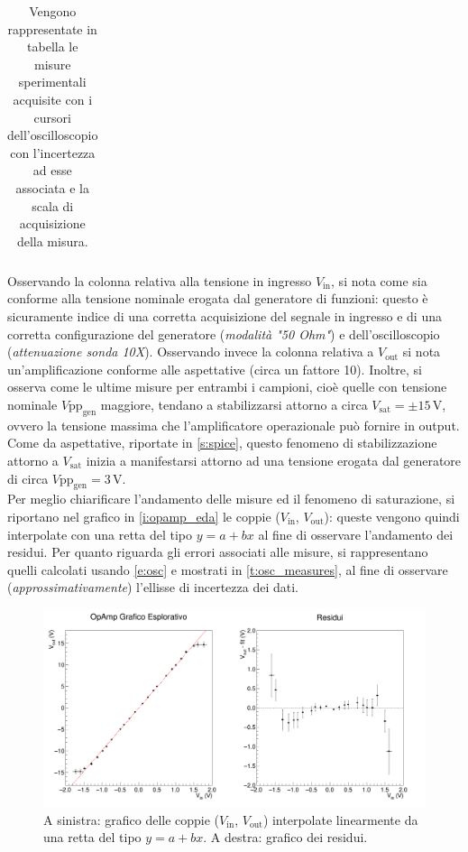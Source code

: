 \documentclass[a4paper,11pt]{article} %
\begin{document}
\begin{table}[H]
\begin{tabular}{x{2cm} x{3cm} x{3.2cm} x{3cm} x{3.2cm}}
		
		\bottomrule[0.5px]
		
	\end{tabular}
	\caption{Vengono rappresentate in tabella le misure sperimentali acquisite con i cursori dell'oscilloscopio 
				con l'incertezza ad esse associata e la scala di acquisizione della misura.}
	\label{t:osc_measures}
\end{table}	

\noindent  Osservando la colonna relativa alla tensione in ingresso $V_{\text{in}}$, si nota come sia conforme alla
tensione nominale erogata dal generatore di funzioni: questo è sicuramente indice di una corretta acquisizione del
segnale in ingresso e di una corretta configurazione del generatore (\textit{modalità "50 Ohm"}) e dell'oscilloscopio
(\textit{attenuazione sonda 10X}). Osservando invece la colonna relativa a $V_{\text{out}}$ si nota un'amplificazione
conforme alle aspettative (circa un fattore 10). Inoltre, si osserva come le ultime misure per entrambi i campioni, cioè
quelle con tensione nominale $V\text{pp}_{\text{gen}}$ maggiore, tendano a stabilizzarsi attorno a circa
$V_{\text{sat}}=\pm15\,\si{\volt}$, ovvero la tensione massima che l'amplificatore operazionale può fornire in output.
Come da aspettative, riportate in \autoref{s:spice}, questo fenomeno di stabilizzazione attorno a $V_{\text{sat}}$
inizia a manifestarsi attorno ad una tensione erogata dal generatore di circa $V\text{pp}_{\text{gen}}=3\,\si{\volt}$.\\
Per meglio chiarificare l'andamento delle misure ed il fenomeno di saturazione, si riportano nel grafico in
\autoref{i:opamp_eda} le coppie ($V_{\text{in}}$, $V_{\text{out}}$): queste vengono quindi interpolate con una retta del
tipo $y=a+bx$ al fine di osservare l'andamento dei residui. Per quanto riguarda gli errori associati alle misure, si
rappresentano quelli calcolati usando \autoref{e:osc} e mostrati in \autoref{t:osc_measures}, al fine di osservare
(\textit{approssimativamente}) l'ellisse di incertezza dei dati.

\begin{figure}[H]
	\centering
	\includegraphics[width=15cm]{../Plots/Report_Plots/opamp_plot_alldata_eda.png}
	\caption{A sinistra: grafico delle coppie ($V_{\text{in}}$, $V_{\text{out}}$) interpolate linearmente da una retta
	del tipo $y=a+bx$. A destra: grafico dei residui.}
	\label{i:opamp_eda}
\end{figure}
\end{document}
